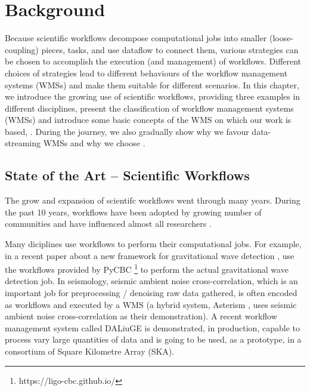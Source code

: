 \chapter{Background}
Because scientific workflows decompose computational jobs into smaller (loose-coupling) pieces, tasks, and use dataflow to connect them, various strategies can be chosen to accomplish the execution (and management) of workflows. Different choices of strategies lead to different behaviours of the workflow management systems (WMSs) and make them suitable for different scenarios. In this chapter, we introduce the growing use of scientific workflows, providing three examples in different disciplines, present the classification of workflow management systems (WMSs) and introduce some basic concepts of the WMS on which our work is based, \dpy. During the journey, we also gradually show why we favour data-streaming WMSs and why we choose \dpy.

\section{State of the Art -- Scientific Workflows}
The grow and expansion of scientifc workflows went through many years. During the past 10 years, workflows have been adopted by growing number of communities and have influenced almost all researchers \cite{ATKINSON2017216}.

Many diciplines use workflows to perform their computational jobs. For example, in a recent paper about a new framework for gravitational wave detection \cite{gwave}, \citeauthor{gwave} use the workflows provided by PyCBC \footnote{https://ligo-cbc.github.io/} to perform the actual gravitational wave detection job. In seismology, seismic ambient noise cross-correlation, which is an important job for preprocessing / denoising raw data gathered, is often encoded as workflows and executed by a WMS (\eg a hybrid system, Asterism \cite{Asterism}, uses seismic ambient noise cross-correlation as their demonstration). A recent workflow management system called DALiuGE \cite{wu2017daliuge} is demonstrated, in production, capable to process vary large quantities of data and is going to be used, as a prototype, in a consortium of Square Kilometre Array (SKA).

